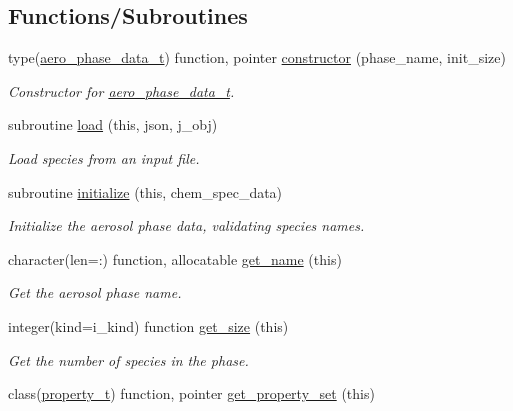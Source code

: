 \subsection*{Functions/\+Subroutines}
\begin{DoxyCompactItemize}
\item 
type(\mbox{\hyperlink{structpmc__aero__phase__data_1_1aero__phase__data__t}{aero\+\_\+phase\+\_\+data\+\_\+t}}) function, pointer \mbox{\hyperlink{namespacepmc__aero__phase__data_ae2a9e6bfb1747e2ace93ab3fadd55530}{constructor}} (phase\+\_\+name, init\+\_\+size)
\begin{DoxyCompactList}\small\item\em Constructor for \mbox{\hyperlink{structpmc__aero__phase__data_1_1aero__phase__data__t}{aero\+\_\+phase\+\_\+data\+\_\+t}}. \end{DoxyCompactList}\item 
subroutine \mbox{\hyperlink{namespacepmc__aero__phase__data_a2210cf15989db48f4c603a91ed23f7ea}{load}} (this, json, j\+\_\+obj)
\begin{DoxyCompactList}\small\item\em Load species from an input file. \end{DoxyCompactList}\item 
subroutine \mbox{\hyperlink{namespacepmc__aero__phase__data_a203648cd90bd6eebc09c9f8238122deb}{initialize}} (this, chem\+\_\+spec\+\_\+data)
\begin{DoxyCompactList}\small\item\em Initialize the aerosol phase data, validating species names. \end{DoxyCompactList}\item 
character(len=\+:) function, allocatable \mbox{\hyperlink{namespacepmc__aero__phase__data_afdcb4ccd85ae85a97eaf71114c14722f}{get\+\_\+name}} (this)
\begin{DoxyCompactList}\small\item\em Get the aerosol phase name. \end{DoxyCompactList}\item 
integer(kind=i\+\_\+kind) function \mbox{\hyperlink{namespacepmc__aero__phase__data_acf59c1ac8fbb92b9d922cc94d4a89571}{get\+\_\+size}} (this)
\begin{DoxyCompactList}\small\item\em Get the number of species in the phase. \end{DoxyCompactList}\item 
class(\mbox{\hyperlink{structpmc__property_1_1property__t}{property\+\_\+t}}) function, pointer \mbox{\hyperlink{namespacepmc__aero__phase__data_a6fa987c0d6f358d46d5b84410129c789}{get\+\_\+property\+\_\+set}} (this)

\end{DoxyCompactItemize}
